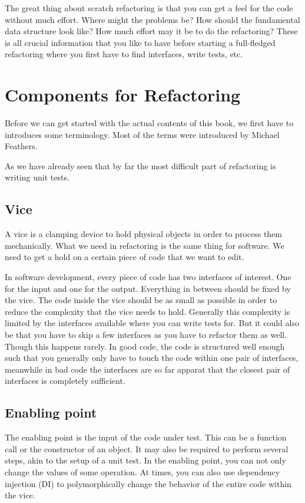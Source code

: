 The great thing about scratch refactoring is that you can get a feel for the code without much effort. Where might the problems be? How should the fundamental data structure look like? How much effort may it be to do the refactoring? These is all crucial information that you like to have before starting a full-fledged refactoring where you first have to find interfaces, write tests, etc.

\chapter{Components for Refactoring}

Before we can get started with the actual contents of this book, we first have to introduces some terminology. Most of the terms were introduced by Michael Feathers.

As we have already seen that by far the most difficult part of refactoring is writing unit tests. 

\section{Vice}

A vice is a clamping device to hold physical objects in order to process them mechanically. What we need in refactoring is the same thing for software. We need to get a hold on a certain piece of code that we want to edit.

In software development, every piece of code has two interfaces of interest. One for the input and one for the output. Everything in between should be fixed by the vice. The code inside the vice should be as small as possible in order to reduce the complexity that the vice needs to hold. Generally this complexity is limited by the interfaces available where you can write tests for. But it could also be that you have to skip a few interfaces as you have to refactor them as well. Though this happens rarely. In good code, the code is structured well enough such that you generally only have to touch the code within one pair of interfaces, meanwhile in bad code the interfaces are so far apparat that the closest pair of interfaces is completely sufficient.

\section{Enabling point}

The enabling point is the input of the code under test. This can be a function call or the constructor of an object. It may also be required to perform several steps, akin to the setup of a unit test. In the enabling point, you can not only change the values of some operation. At times, you can also use dependency injection (DI) to polymorphically change the behavior of the entire code within the vice.

